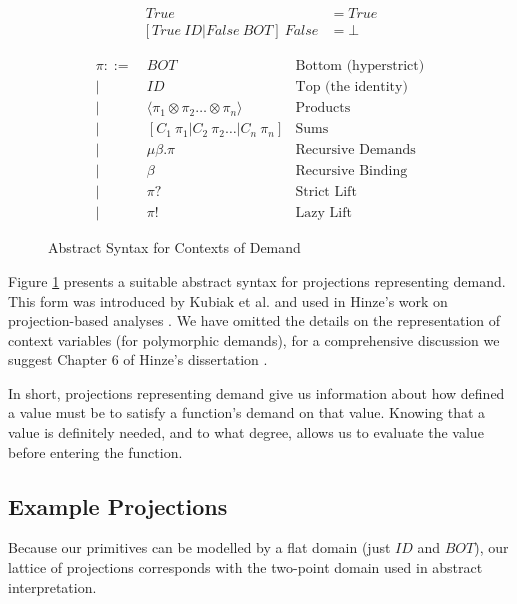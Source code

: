 \begin{align*}
[True\ ID | False\ ID]  \ True &= True \\
[True\ ID | False\ BOT] \ False &= \bot
\end{align*}

\begin{figure}
\begin{align*}
    \pi ::=&\ BOT              & \text{Bottom (hyperstrict)} \\
        |&\ ID               & \text{Top (the identity)} \\
        |&\ \langle \pi_{1} \otimes \pi_{2} \dots \otimes \pi_{n} \rangle   & \text{Products} \\ 
        |&\ [C_{1} \ \pi_{1} | C_{2} \ \pi_{2} \dots | C_{n} \ \pi_{n}]    & \text{Sums} \\ 
        |&\ \mu\beta . \pi     & \text{Recursive Demands} \\
        |&\ \beta              & \text{Recursive Binding} \\
        |&\ \pi?               & \text{Strict Lift} \\
        |&\ \pi!               & \text{Lazy Lift}
\end{align*}
\caption{Abstract Syntax for Contexts of Demand}
\label{fig:ContextAST}
\end{figure}


Figure \ref{fig:ContextAST}  presents a
suitable abstract syntax for projections representing demand.  This form was
introduced by Kubiak et al. and used in Hinze's work on projection-based
analyses \citep{kubiak, hinze1995projection}.  We have omitted the details on
the representation of context variables (for polymorphic demands), for a
comprehensive discussion we suggest Chapter 6 of Hinze's dissertation
\citep{hinze1995projection}.

In short, projections representing demand give us information about how defined
a value must be to satisfy a function's demand on that value. Knowing that a
value is definitely needed, and to what degree, allows us to evaluate the value
before entering the function.

\subsection*{Example Projections}

Because our primitives can be modelled by a flat domain (just $ID$ and $BOT$),
our lattice of projections corresponds with the two-point domain used in
abstract interpretation.

